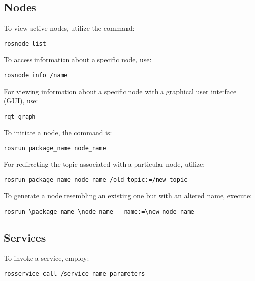 \subsection{Nodes}
To view active nodes, utilize the command:
\begin{verbatim}
rosnode list
\end{verbatim}
To access information about a specific node, use:
\begin{verbatim}
rosnode info /name
\end{verbatim}
For viewing information about a specific node with a graphical user interface (GUI), use:
\begin{verbatim}
rqt_graph
\end{verbatim}
To initiate a node, the command is:
\begin{verbatim}
rosrun package_name node_name
\end{verbatim}
For redirecting the topic associated with a particular node, utilize:
\begin{verbatim}
rosrun package_name node_name /old_topic:=/new_topic
\end{verbatim}
To generate a node resembling an existing one but with an altered name, execute:
\begin{verbatim}
rosrun \package_name \node_name --name:=\new_node_name
\end{verbatim}

\subsection{Services}
To invoke a service, employ:
\begin{verbatim}
rosservice call /service_name parameters
\end{verbatim}

